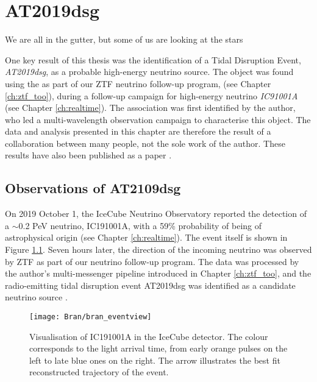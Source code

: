 \setchapterpreamble[u]{\margintoc}
\chapter{AT2019dsg}
\begin{fquote}We are all in the gutter, but some of us are looking at the stars
\end{fquote}

One key result of this thesis was the identification of a Tidal Disruption Event, \emph{AT2019dsg}, as a probable high-energy neutrino source. The object was found using the \ztf{} as part of our ZTF neutrino follow-up program, (see Chapter \ref{ch:ztf_too}), during a follow-up campaign for high-energy neutrino \emph{IC91001A} (see Chapter \ref{ch:realtime}). The association was first identified by the author, who led a multi-wavelength observation campaign to characterise this object. The data and analysis presented in this chapter are therefore the result of a collaboration between many people, not the sole work of the author. These results have also been published as a paper .

\section{Observations of AT2109dsg}
\label{sec:bran_obs}

On 2019 October 1, the IceCube Neutrino Observatory reported the detection of a $\sim$0.2 PeV neutrino, IC191001A, with a 59\% probability of being of astrophysical origin  (see Chapter \ref{ch:realtime}). The event itself is shown in Figure \ref{fig:bran_eventview}. Seven hours later, the direction of the incoming neutrino was observed by ZTF as part of our neutrino follow-up program. The data was processed by the author's multi-messenger pipeline introduced in Chapter \ref{ch:ztf_too}, and the radio-emitting tidal disruption event AT2019dsg was identified as a candidate neutrino source . 

\begin{figure}[!ht]
	\texttt{[image: Bran/bran\_eventview]}
	\caption{Visualisation of IC191001A in the IceCube detector. The colour corresponds to the light arrival time, from early orange pulses on the left to late blue ones on the right. The arrow illustrates the best fit reconstructed trajectory of the event.}
	\label{fig:bran_eventview}
\end{figure}

